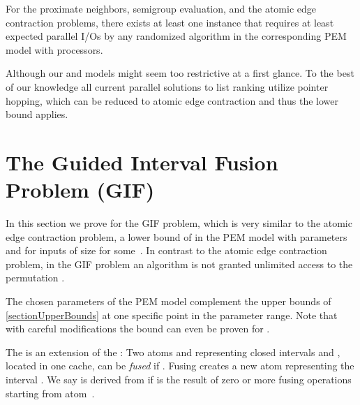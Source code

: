 \documentclass[envcountsame]{llncs}
\def\bOm#1{\printmath{\Omega \left(#1\right)}}
\begin{document}
\begin{theorem}
For the proximate neighbors, semigroup evaluation, and the atomic edge contraction problems, there exists at least one instance that requires at least \bOm{\permp{\inputSize,\memorySize,\blockSize} + \log P} expected parallel I/Os by any randomized algorithm in the corresponding PEM model with  processors. 
\end{theorem}



Although our \semigroupPEM and \bridgingPEM models might seem too restrictive at a first glance.
To the best of our knowledge all current parallel solutions to list ranking utilize pointer hopping, which can be reduced to atomic edge contraction and thus the lower bound applies. 










\section{The Guided Interval Fusion Problem (GIF)}

\label{sectionIPNLB}




In this section we prove for the GIF problem, which is very similar to the atomic edge contraction problem, a lower bound  of \bOm{\log^2 \inputSize} in the PEM model with parameters  and  for inputs of size  for some~\mbox{}. 
In contrast to the atomic edge contraction problem, in the GIF problem an algorithm is not granted unlimited access to the permutation \permutation{}.


The chosen parameters of the PEM model complement the upper bounds of \autoref{sectionUpperBounds} at one specific point in the parameter range.
Note that with careful modifications the \bOm{\log^2 \inputSize} bound can even be proven for .




\begin{definition}
The \emph{\fusePEM} is an extension of the \movePEM:
Two atoms  and  representing closed intervals  and , located in one cache, can be \emph{fused} if .
Fusing creates a new atom  representing the interval . 
We say  is derived from  if  is the result of zero or more fusing operations starting from atom~.
\end{definition}
\end{document}
